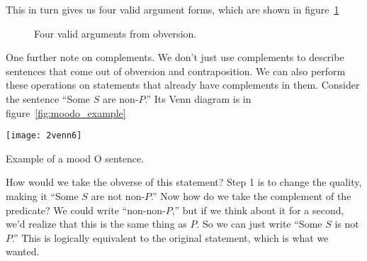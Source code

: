 This in turn gives us four valid argument forms, which are shown in figure~\ref{fig:obversion_arguments}

\begin{figure}
\begin{minipage}[t]{0.4\textwidth}
\begin{kormanize}
\end{kormanize}
\end{minipage}\hspace{1cm}
\begin{minipage}[t]{0.4\textwidth}
\begin{kormanize}
\end{kormanize}
\end{minipage}

\vspace{1cm}

\begin{minipage}[t]{0.4\textwidth}
\begin{kormanize}
\end{kormanize}
\end{minipage}\hspace{1cm}
\begin{minipage}[t]{0.4\textwidth}
\begin{kormanize}
\end{kormanize}
\end{minipage}
\caption{Four valid arguments from obversion.}
\label{fig:obversion_arguments}
\end{figure}

One further note on complements. We don't just use complements to describe sentences that come out of obversion and contraposition. We can also perform these operations on statements that already have complements in them. Consider the sentence ``Some $S$ are non-$P$.'' Its Venn diagram is in figure~\ref{fig:moodo_example}

\begin{marginfigure}
\texttt{[image: 2venn6]}
\caption{Example of a mood O sentence.}
\label{fig:moodo_example}
\end{marginfigure}


How would we take the obverse of this statement? Step 1 is to change the quality, making it ``Some $S$ are not non-$P$.'' Now how do we take the complement of the predicate? We could write ``non-non-$P$,'' but if we think about it for a second, we'd realize that this is the same thing as $P$. So we can just write ``Some $S$ is not $P$.'' This is logically equivalent to the original statement, which is what we wanted.

